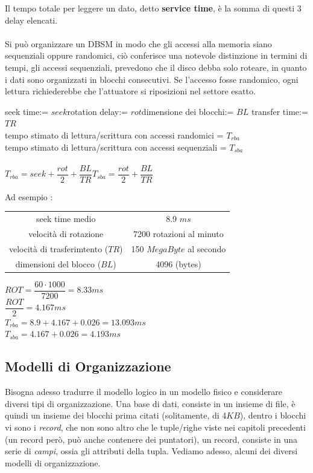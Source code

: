 \documentclass[12pt, letterpaper]{article}
\newcommand{\acc}{\\\hphantom{}\\}
\begin{document}
Il tempo totale per leggere un dato, detto \textbf{service time}, è la somma di questi 3 delay elencati.\acc 
Si può organizzare un DBSM in modo che gli accessi alla memoria siano sequenziali oppure randomici, ciò conferisce una 
notevole distinzione in termini di tempi, gli accessi sequenziali, prevedono che il disco debba solo roteare, in quanto 
i dati sono organizzati in blocchi consecutivi. Se l'accesso fosse randomico, ogni lettura richiederebbe che l'attuatore 
si riposizioni nel settore esatto.\begin{center}
    seek time:= \(seek\)\hphantom{aa}rotation delay:= \(rot\)\hphantom{aa}dimensione dei blocchi:= \(BL\)\hphantom{aa} transfer time:= \(TR\)
    \\ tempo stimato di lettura/scrittura con accessi randomici = \(T_{rba}\)\\  tempo stimato di lettura/scrittura con accessi sequenziali = \(T_{sba}\)\acc
    \(T_{rba}=seek+\dfrac{rot}{2}+\dfrac{BL}{TR}\)\hphantom{aaaaaaaa}\(T_{sba}=\dfrac{rot}{2}+\dfrac{BL}{TR}\)
\end{center}
Ad esempio : 
\begin{center}
    \begin{tabular}{cc}
        \rowcolor[HTML]{C0C0C0} 
        seek time medio                     & 8.9 \(ms\)                  \\
        \rowcolor[HTML]{EFEFEF} 
        velocità di rotazione               & 7200 rotazioni al minuto    \\
        \rowcolor[HTML]{C0C0C0} 
        velocità di trasferimtento (\(TR\)) & 150 \(MegaByte\) al secondo \\
        \rowcolor[HTML]{EFEFEF} 
        dimensioni del blocco (\(BL\))      & 4096 (bytes)               
        \end{tabular}
     
\end{center}
\(ROT=\dfrac{60\cdot 1000}{7200}=8.33ms\)\\
\(\dfrac{ROT}{2}=4.167ms\)\\
\(T_{rba}=8.9+4.167+0.026 = 13.093 ms\)\\ 
\(T_{sba}=4.167+0.026 = 4.193 ms\)
\subsection{Modelli di Organizzazione}
Bisogna adesso tradurre il modello logico in un modello fisico e considerare diversi tipi di organizzazione. Una base di dati, 
consiste in un insieme di file, è quindi un insieme dei blocchi prima citati (solitamente, di 4\(KB\)), dentro i blocchi vi sono 
i \textit{record}, che non sono altro che le tuple/righe viste nei capitoli precedenti (un record però, può anche contenere dei 
puntatori), un record, consiste in una serie di \textit{campi}, ossia gli attributi della tupla. Vediamo adesso, alcuni dei diversi modelli 
di organizzazione.
\end{document}
